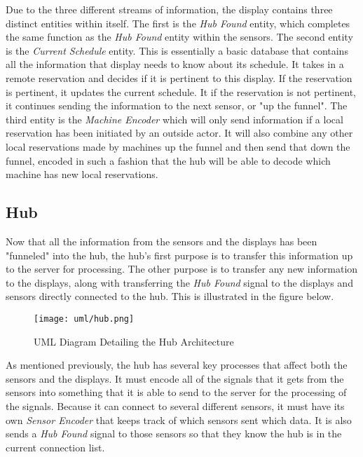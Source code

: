 \documentclass[PPFS.tex]{template/subfiles}
\begin{document}
Due to the three different streams of information, the display contains three distinct entities within itself. The first is the \textit{Hub Found} entity, which completes the same function as the \textit{Hub Found} entity within the sensors. The second entity is the \textit{Current Schedule} entity. This is essentially a basic database that contains all the information that display needs to know about its schedule. It takes in a remote reservation and decides if it is pertinent to this display. If the reservation is pertinent, it updates the current schedule. It if the reservation is not pertinent, it continues sending the information to the next sensor, or "up the funnel". The third entity is the \textit{Machine Encoder} which will only send information if a local reservation has been initiated by an outside actor. It will also combine any other local reservations made by machines up the funnel and then send that down the funnel, encoded in such a fashion that the hub will be able to decode which machine has new local reservations.

\subsection{Hub}

Now that all the information from the sensors and the displays has been "funneled" into the hub, the hub's first purpose is to transfer this information up to the server for processing. The other purpose is to transfer any new information to the displays, along with transferring the \textit{Hub Found} signal to the displays and sensors directly connected to the hub. This is illustrated in the figure below.

\begin{figure}[H]
    \centering
    \texttt{[image: uml/hub.png]}
    \caption{UML Diagram Detailing the Hub Architecture}
\end{figure}

As mentioned previously, the hub has several key processes that affect both the sensors and the displays. It must encode all of the signals that it gets from the sensors into something that it is able to send to the server for the processing of the signals. Because it can connect to several different sensors, it must have its own \textit{Sensor Encoder} that keeps track of which sensors sent which data. It is also sends a \textit{Hub Found} signal to those sensors so that they know the hub is in the current connection list.
\end{document}
